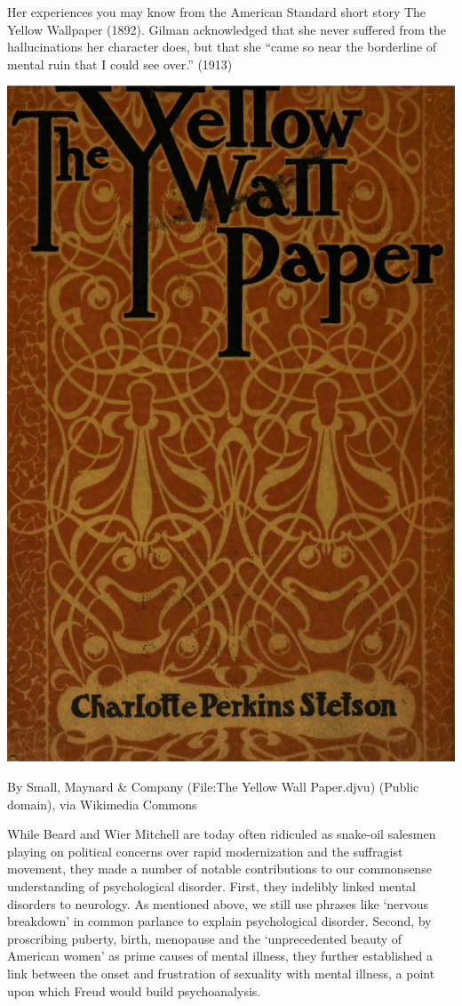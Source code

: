 \begin{refsection}
Her experiences you may know from the American Standard short story The Yellow Wallpaper (1892). Gilman acknowledged that she never suffered from the hallucinations her character does, but that she “came so near the borderline of mental ruin that I could see over.” (1913)
\begin{marginfigure}
 \begin{center}
     \includegraphics[scale=0.25]{../images/The_Yellow_Wall_Paper}
\end{center}
 \caption{By Small, Maynard \& Company (File:The Yellow Wall Paper.djvu) (Public domain), via Wikimedia Commons}
\label{fig: yellowwallpaper}
\end{marginfigure}
 

While Beard and Wier Mitchell are today often ridiculed as snake-oil salesmen playing on political concerns over rapid modernization and the suffragist movement, they made a number of notable contributions to our commonsense understanding of psychological disorder. First, they indelibly linked mental disorders to neurology. As mentioned above, we still use phrases like `nervous breakdown' in common parlance to explain psychological disorder. Second, by proscribing puberty, birth, menopause and the `unprecedented beauty of American women' as prime causes of mental illness, they further established a link between the onset and frustration of sexuality with mental illness, a point upon which Freud would build psychoanalysis.


\end{refsection}

